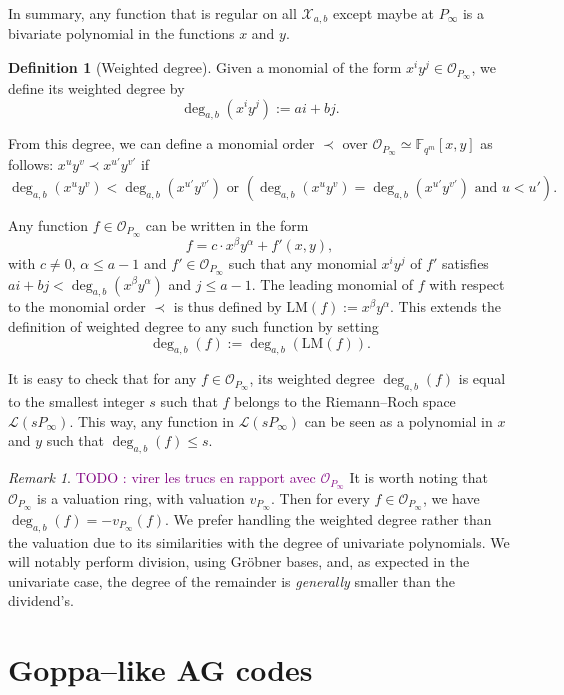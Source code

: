 \documentclass[a4paper]{amsart}
\theoremstyle{definition}
\newtheorem{definition}[thm]{Definition}
\theoremstyle{remark}
\newtheorem{remark}[thm]{Remark}
\newcommand{\calL}{\mathcal{L}}
\newcommand{\calO}{\mathcal{O}}
\newcommand{\calX}{\mathcal{X}}
\newcommand{\fqm}{\mathbb{F}_{q^m}}
\newcommand{\degab}[1]{\deg_{a,b}\left(#1\right)}
\newcommand\jade[1]{\textcolor{purple}{#1}}
\begin{document}
In summary, any function that is regular on all $\calX_{a,b}$ except maybe at $P_\infty$ is a bivariate polynomial in the functions $x$ and $y$. 

\begin{definition}[Weighted degree]
Given a monomial of the form $x^iy^j \in \calO_{P_\infty}$, we define its weighted degree by
\[ \degab{x^iy^j} := ai+bj.\]

From this degree, we can define a monomial order $\prec$ over $\calO_{P_\infty} \simeq \fqm[x,y]$ as follows: $x^uy^v \prec x^{u'}y^{v'}$ if
\begin{equation}\label{eq:def_mon_order}
\degab{x^uy^v} < \degab{x^{u'}y^{v'}} \text{ or } \left(\degab{x^uy^v} = \degab{x^{u'}y^{v'}}  \text{ and } u < u'\right).
\end{equation}

%
Any function $f \in \calO_{P_\infty}$ can be written in the form $$f = c \cdot x^{\beta}y^{\alpha} + f'(x,y),$$
with $c \neq 0$, $\alpha \leq a-1$ and $f' \in \calO_{P_\infty}$ such that any monomial $x^iy^j$ of $f'$ satisfies $ai+bj < \degab{x^{\beta}y^{\alpha}}$ and $j \leq a-1$. The leading monomial of $f$ with respect to the monomial order $\prec$ is thus defined by $\mathrm{LM}(f) := x^{\beta}y^{\alpha}$. This extends the definition of weighted degree to any such function by setting 
\[\degab{f} := \degab{\mathrm{LM}(f)}.\]
\end{definition}
It is easy to check that for any $f \in \calO_{P_\infty}$, its weighted degree $\degab{f}$ is equal to the smallest integer $s$ such that $f$ belongs to the Riemann--Roch space $\calL(sP_{\infty})$.
%
This way, any function in $\calL(sP_\infty)$ can be seen as a polynomial in $x$ and $y$ such that $\degab{f}\leq s$. 
\begin{remark}
	\jade{TODO : virer les trucs en rapport avec $\calO_{P_\infty}$}
It is worth noting that $\calO_{P_\infty}$ is a valuation ring, with valuation $v_{P_\infty}$. Then for every $f \in \calO_{P_\infty}$, we have $\degab{f}=-v_{P_\infty}(f)$. We prefer handling the weighted degree rather than the valuation due to its similarities with the degree of univariate 
polynomials. We will notably perform division, using Gr\"obner bases, and, as expected in the univariate case, the degree of the remainder is 
\textit{generally} smaller than the dividend's.
\end{remark}


\section{Goppa--like AG codes}\label{sec:Goppa}
\end{document}
